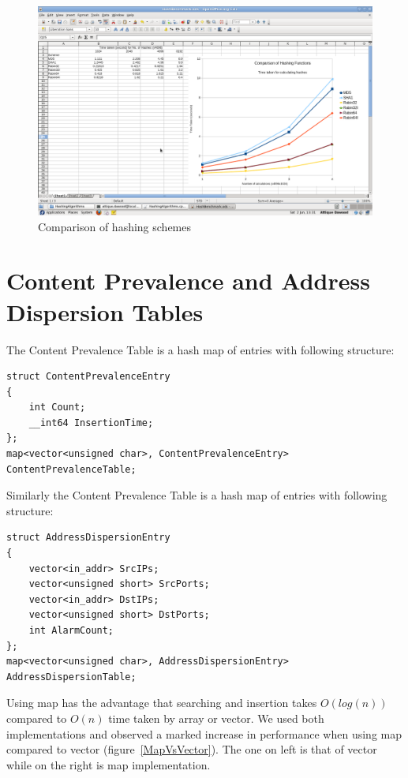 \documentclass{report}
\begin{document}
\begin{figure}[here]
\centering
\includegraphics[width=\textwidth]{HashingSchemes.png}
\caption{Comparison of hashing schemes}
\label{HashingSchemes}
\end{figure}

\section{Content Prevalence and Address Dispersion Tables}
The Content Prevalence Table is a hash map of entries with following structure:
\begin{verbatim}
struct ContentPrevalenceEntry
{
    int Count;
    __int64 InsertionTime;
};
map<vector<unsigned char>, ContentPrevalenceEntry> ContentPrevalenceTable;
\end{verbatim}

Similarly the Content Prevalence Table is a hash map of entries with following structure:
\begin{verbatim}
struct AddressDispersionEntry
{
    vector<in_addr> SrcIPs;
    vector<unsigned short> SrcPorts;
    vector<in_addr> DstIPs;
    vector<unsigned short> DstPorts;
    int AlarmCount;
};
map<vector<unsigned char>, AddressDispersionEntry> AddressDispersionTable;
\end{verbatim}

Using map has the advantage that searching and insertion takes $O(log(n))$ compared to $O(n)$ time taken by array or vector. We used both implementations and observed a marked increase in performance when using map compared to vector (figure~\ref{MapVsVector}). The one on left is that of vector while on the right is map implementation.
\end{document}
